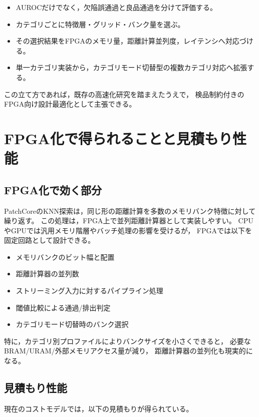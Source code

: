 \documentclass[uplatex,dvipdfmx,a4paper,11pt]{jsarticle}
\begin{document}
\begin{itemize}
  \item AUROCだけでなく，欠陥誤通過と良品通過を分けて評価する。
  \item カテゴリごとに特徴層・グリッド・バンク量を選ぶ。
  \item その選択結果をFPGAのメモリ量，距離計算並列度，レイテンシへ対応づける。
  \item 単一カテゴリ実装から，カテゴリモード切替型の複数カテゴリ対応へ拡張する。
\end{itemize}

この立て方であれば，既存の高速化研究を踏まえたうえで，
検品制約付きのFPGA向け設計最適化として主張できる。

\section{FPGA化で得られることと見積もり性能}

\subsection{FPGA化で効く部分}

PatchCoreのKNN探索は，同じ形の距離計算を多数のメモリバンク特徴に対して繰り返す。
この処理は，FPGA上で並列距離計算器として実装しやすい。
CPUやGPUでは汎用メモリ階層やバッチ処理の影響を受けるが，
FPGAでは以下を固定回路として設計できる。

\begin{itemize}
  \item メモリバンクのビット幅と配置
  \item 距離計算器の並列数
  \item ストリーミング入力に対するパイプライン処理
  \item 閾値比較による通過/排出判定
  \item カテゴリモード切替時のバンク選択
\end{itemize}

特に，カテゴリ別プロファイルによりバンクサイズを小さくできると，
必要なBRAM/URAM/外部メモリアクセス量が減り，
距離計算器の並列化も現実的になる。

\subsection{見積もり性能}

現在のコストモデルでは，以下の見積もりが得られている。
\end{document}
